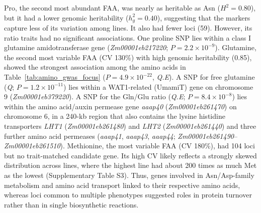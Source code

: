 Pro, the second most abundant FAA, was nearly as heritable as Asn ($H^2 = 0.80$), but it had a lower genomic heritability ($h^2_g = 0.40$), suggesting that the markers capture less of its variation among lines. It also had fewer loci (59). However, its ratio traits had no significant associations. One proline SNP lies within a class I glutamine amidotransferase gene (\textit{Zm00001eb217220}; $P = 2.2 \times 10^{-9}$). Glutamine, the second most variable FAA (CV 130\%) with high genomic heritability (0.85), showed the strongest association among the amino acids in Table~\ref{tab:amino_gwas_focus} ($P = 4.9 \times 10^{-22}$, \textit{Q.E}). A SNP for free glutamine (\textit{Q}; $P = 1.2 \times 10^{-11}$) lies within a WAT1-related (UmamiT) gene on chromosome 9 (\textit{Zm00001eb379220}). A SNP for the Gln/Glu ratio (\textit{Q.E}; $P = 8.4 \times 10^{-8}$) lies within the amino acid/auxin permease gene \textit{aaap40} (\textit{Zm00001eb261470}) on chromosome 6, in a 240-kb region that also contains the lysine histidine transporters \textit{LHT1} (\textit{Zm00001eb261480}) and \textit{LHT2} (\textit{Zm00001eb261440}) and three further amino acid permeases (\textit{aaap41}, \textit{aaap43}, \textit{aaap44}; \textit{Zm00001eb261490}--\textit{Zm00001eb261510}). Methionine, the most variable FAA (CV 180\%), had 104 loci but no trait-matched candidate gene. Its high CV likely reflects a strongly skewed distribution across lines, where the highest line had about 200 times as much Met as the lowest (Supplementary Table S3). Thus, genes involved in Asn/Asp-family metabolism and amino acid transport linked to their respective amino acids, whereas loci common to multiple phenotypes suggested roles in protein turnover rather than in single biosynthetic reactions.

